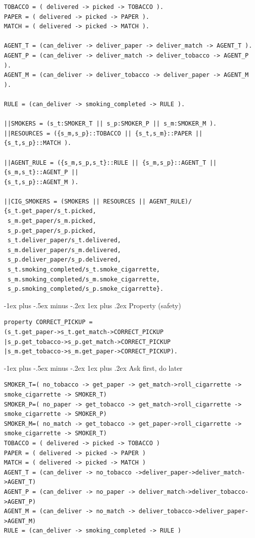 \documentclass[letterpaper, 8pt]{extarticle}
\makeatletter
\renewcommand{\subsubsection}{\@startsection{subsubsection}{3}{0mm}%
                                {-1ex plus -.5ex minus -.2ex}%
                                {1ex plus .2ex}%
                                {\normalfont\tiny\bfseries}}
\makeatother
\begin{document}
\begin{multicols*}{5}
\begin{lstlisting}
TOBACCO = ( delivered -> picked -> TOBACCO ).
PAPER = ( delivered -> picked -> PAPER ).
MATCH = ( delivered -> picked -> MATCH ).

AGENT_T = (can_deliver -> deliver_paper -> deliver_match -> AGENT_T ).
AGENT_P = (can_deliver -> deliver_match -> deliver_tobacco -> AGENT_P ).
AGENT_M = (can_deliver -> deliver_tobacco -> deliver_paper -> AGENT_M ).

RULE = (can_deliver -> smoking_completed -> RULE ).

||SMOKERS = (s_t:SMOKER_T || s_p:SMOKER_P || s_m:SMOKER_M ).
||RESOURCES = ({s_m,s_p}::TOBACCO || {s_t,s_m}::PAPER || {s_t,s_p}::MATCH ).

||AGENT_RULE = ({s_m,s_p,s_t}::RULE || {s_m,s_p}::AGENT_T || {s_m,s_t}::AGENT_P ||
{s_t,s_p}::AGENT_M ).

||CIG_SMOKERS = (SMOKERS || RESOURCES || AGENT_RULE)/
{s_t.get_paper/s_t.picked,
 s_m.get_paper/s_m.picked,
 s_p.get_paper/s_p.picked,
 s_t.deliver_paper/s_t.delivered,
 s_m.deliver_paper/s_m.delivered,
 s_p.deliver_paper/s_p.delivered,
 s_t.smoking_completed/s_t.smoke_cigarrette,
 s_m.smoking_completed/s_m.smoke_cigarrette,
 s_p.smoking_completed/s_p.smoke_cigarrette}.
\end{lstlisting}

\subsubsection{Property (safety)}
\begin{lstlisting}
property CORRECT_PICKUP =
(s_t.get_paper->s_t.get_match->CORRECT_PICKUP
|s_p.get_tobacco->s_p.get_match->CORRECT_PICKUP
|s_m.get_tobacco->s_m.get_paper->CORRECT_PICKUP).
\end{lstlisting}

\subsubsection{Ask first, do later}
\begin{lstlisting}
SMOKER_T=( no_tobacco -> get_paper -> get_match->roll_cigarrette ->
smoke_cigarrette -> SMOKER_T)
SMOKER_P=( no_paper -> get_tobacco -> get_match->roll_cigarrette ->
smoke_cigarrette -> SMOKER_P)
SMOKER_M=( no_match -> get_tobacco -> get_paper->roll_cigarrette ->
smoke_cigarrette -> SMOKER_T)
TOBACCO = ( delivered -> picked -> TOBACCO )
PAPER = ( delivered -> picked -> PAPER )
MATCH = ( delivered -> picked -> MATCH )
AGENT_T = (can_deliver -> no_tobacco ->deliver_paper->deliver_match->AGENT_T)
AGENT_P = (can_deliver -> no_paper -> deliver_match->deliver_tobacco->AGENT_P)
AGENT_M = (can_deliver -> no_match -> deliver_tobacco->deliver_paper->AGENT_M)
RULE = (can_deliver -> smoking_completed -> RULE )


\end{lstlisting}
\end{multicols*}
\end{document}
